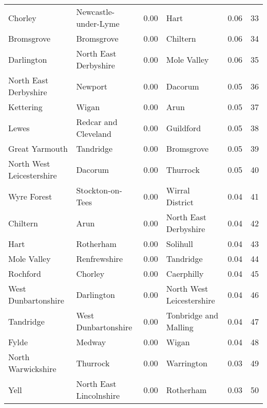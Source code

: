 \begin{tabular}{llrlrr}
Chorley                   &       Newcastle-under-Lyme &  0.00 &                       Hart &    0.06 &    33 \\
Bromsgrove                &                 Bromsgrove &  0.00 &                   Chiltern &    0.06 &    34 \\
Darlington                &      North East Derbyshire &  0.00 &                Mole Valley &    0.06 &    35 \\
North East Derbyshire     &                    Newport &  0.00 &                    Dacorum &    0.05 &    36 \\
Kettering                 &                      Wigan &  0.00 &                       Arun &    0.05 &    37 \\
Lewes                     &       Redcar and Cleveland &  0.00 &                  Guildford &    0.05 &    38 \\
Great Yarmouth            &                  Tandridge &  0.00 &                 Bromsgrove &    0.05 &    39 \\
North West Leicestershire &                    Dacorum &  0.00 &                   Thurrock &    0.05 &    40 \\
Wyre Forest               &           Stockton-on-Tees &  0.00 &            Wirral District &    0.04 &    41 \\
Chiltern                  &                       Arun &  0.00 &      North East Derbyshire &    0.04 &    42 \\
Hart                      &                  Rotherham &  0.00 &                   Solihull &    0.04 &    43 \\
Mole Valley               &               Renfrewshire &  0.00 &                  Tandridge &    0.04 &    44 \\
Rochford                  &                    Chorley &  0.00 &                 Caerphilly &    0.04 &    45 \\
West Dunbartonshire       &                 Darlington &  0.00 &  North West Leicestershire &    0.04 &    46 \\
Tandridge                 &        West Dunbartonshire &  0.00 &      Tonbridge and Malling &    0.04 &    47 \\
Fylde                     &                     Medway &  0.00 &                      Wigan &    0.04 &    48 \\
North Warwickshire        &                   Thurrock &  0.00 &                 Warrington &    0.03 &    49 \\
Yell                      &    North East Lincolnshire &  0.00 &                  Rotherham &    0.03 &    50 \\
\bottomrule
\end{tabular}

